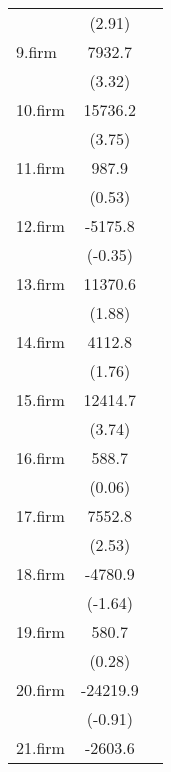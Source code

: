 {\begin{tabular}{l*{2}{c}}
            &      (2.91)         &                     \\
[1em]
9.firm      &      7932.7\sym{***}&                     \\
            &      (3.32)         &                     \\
[1em]
10.firm     &     15736.2\sym{***}&                     \\
            &      (3.75)         &                     \\
[1em]
11.firm     &       987.9         &                     \\
            &      (0.53)         &                     \\
[1em]
12.firm     &     -5175.8         &                     \\
            &     (-0.35)         &                     \\
[1em]
13.firm     &     11370.6         &                     \\
            &      (1.88)         &                     \\
[1em]
14.firm     &      4112.8         &                     \\
            &      (1.76)         &                     \\
[1em]
15.firm     &     12414.7\sym{***}&                     \\
            &      (3.74)         &                     \\
[1em]
16.firm     &       588.7         &                     \\
            &      (0.06)         &                     \\
[1em]
17.firm     &      7552.8\sym{*}  &                     \\
            &      (2.53)         &                     \\
[1em]
18.firm     &     -4780.9         &                     \\
            &     (-1.64)         &                     \\
[1em]
19.firm     &       580.7         &                     \\
            &      (0.28)         &                     \\
[1em]
20.firm     &    -24219.9         &                     \\
            &     (-0.91)         &                     \\
[1em]
21.firm     &     -2603.6         &                     \\

\end{tabular}}
